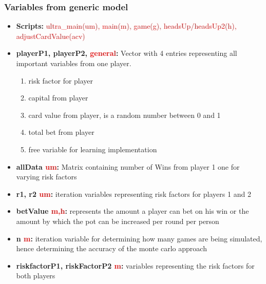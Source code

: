 \documentclass[11pt]{article}
\begin{document}
\subsubsection{Variables from generic model}




\begin{itemize}

\item	\textbf{Scripts:} \textcolor{red}{ultra\_main(um), main(m), game(g), headsUp/headsUp2(h), adjustCardValue(acv)} \\

\item	\textbf{playerP1, playerP2, \textcolor{red}{general}:} Vector with 4 entries representing all important variables from one player.
\begin{enumerate}
	\item risk factor for player
	\item capital from player
	\item card value from player, is a random number between 0 and 1
	\item total bet from player
	\item free variable for learning implementation
\end{enumerate}		
	
	
	
	
\item	\textbf{allData \textcolor{red}{um}:}  Matrix containing number of Wins from player 1 one for varying risk factors\\
	
\item	\textbf{r1, r2 \textcolor{red}{um}:}  iteration variables representing risk factors for players 1 and 2\\

\item	\textbf{betValue \textcolor{red}{m,h}:} represents the amount a player can bet on his win or the amount by which the pot can be increased per round per person \\

\item	\textbf{n \textcolor{red}{m}:}  iteration variable for determining how many games are being simulated, hence determining the accuracy of the monte carlo approach\\

\item	\textbf{riskfactorP1, riskFactorP2 \textcolor{red}{m}:}  variables representing the risk factors for both players\\


\end{itemize}
\end{document}
